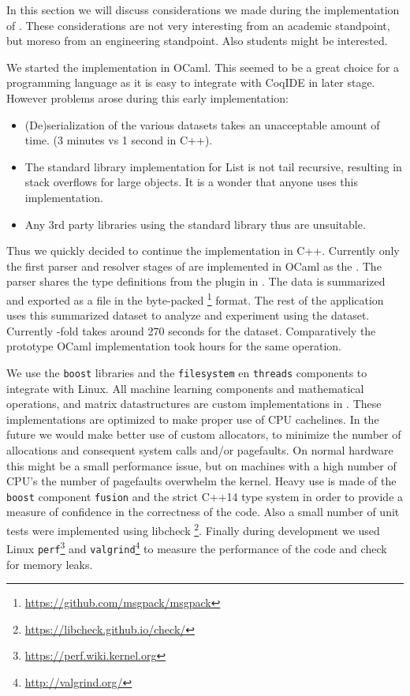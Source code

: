 \label{section:implementation}

In this section we will discuss considerations we made during the implementation of \roerei.
These considerations are not very interesting from an academic standpoint, but moreso from an engineering standpoint.
Also students might be interested.

We started the \roerei implementation in OCaml.
This seemed to be a great choice for a programming language as it is easy to integrate with CoqIDE in later stage.
However problems arose during this early implementation:
\begin{itemize}
\item (De)serialization of the various datasets takes an unacceptable amount of time. (3 minutes vs 1 second in C++).
\item The standard library implementation for List is not tail recursive, resulting in stack overflows for large objects.
    It is a wonder that anyone uses this implementation.
\item Any 3rd party libraries using the standard library thus are unsuitable.
\end{itemize}

Thus we quickly decided to continue the implementation in C++.
Currently only the first parser and resolver stages of \roerei are implemented in OCaml as the \preloader.
The parser shares the \acic type definitions from the \xml plugin in .
The data is summarized and exported as a file in the byte-packed \msgpack\footnote{\url{https://github.com/msgpack/msgpack}} format.
The rest of the \roerei application uses this summarized dataset to analyze and experiment using the dataset.
Currently -fold \crossvalidation takes around 270 seconds for the \coq dataset.
Comparatively the prototype OCaml implementation took hours for the same operation.

We use the \texttt{boost} libraries and the \texttt{filesystem} en \texttt{threads} components to integrate with Linux.
All machine learning components and mathematical operations, and matrix datastructures are custom implementations in \roerei.
These implementations are optimized to make proper use of CPU cachelines.
In the future we would make better use of custom allocators, to minimize the number of allocations and consequent system calls and/or pagefaults.
On normal hardware this might be a small performance issue, but on machines with a high number of CPU's the number of pagefaults overwhelm the kernel.
Heavy use is made of the \texttt{boost} component \texttt{fusion} and the strict C++14 type system in order to provide a measure of
confidence in the correctness of the code.
Also a small number of unit tests were implemented using libcheck \footnote{\url{https://libcheck.github.io/check/}}.
Finally during development we used Linux \texttt{perf}\footnote{\url{https://perf.wiki.kernel.org}} and \texttt{valgrind}\footnote{\url{http://valgrind.org/}}
to measure the performance of the code and check for memory leaks.
